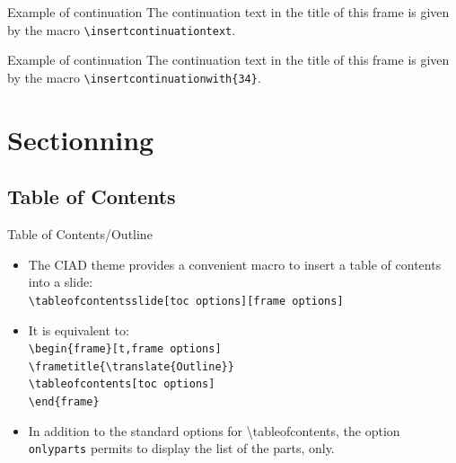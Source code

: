 \documentclass[english,sectioncirclenumberstyle]{ciadbeamer}
\begin{document}
\begin{frame}{Example of continuation \insertcontinuationtext}
	The continuation text in the title of this frame is given by the macro \texttt{{\textbackslash}insertcontinuationtext}.
\end{frame}

\begin{frame}{Example of continuation }
	The continuation text in the title of this frame is given by the macro \texttt{{\textbackslash}insertcontinuationwith\{34\}}.
\end{frame}

\section{Sectionning}
\tableofcontentslide[sectionstyle={show/shaded},subsectionstyle={show/show/hide},subsubsectionstyle={hide/hide/hide/hide},sections={1-6}]

\subsection{Table of Contents}

\begin{frame}{Table of Contents/Outline}
	\begin{itemize}
	\item The CIAD theme provides a convenient macro to insert a table of contents into a slide: \\
		\texttt{{\textbackslash}tableofcontentsslide[toc options][frame options]}
	\vspace{1em}
	\item It is equivalent to: \\
		\texttt{{\textbackslash}begin\{frame\}[t,frame options]} \\
		\texttt{{\textbackslash}frametitle\{{\textbackslash}translate\{Outline\}\}} \\
		\texttt{{\textbackslash}tableofcontents[toc options]} \\
		\texttt{{\textbackslash}end\{frame\}}
	\vspace{1em}
	\item In addition to the standard options for {{\textbackslash}tableofcontents}, the option \texttt{onlyparts} permits to display the list of the parts, only.
	\end{itemize}
\end{frame}
\end{document}
